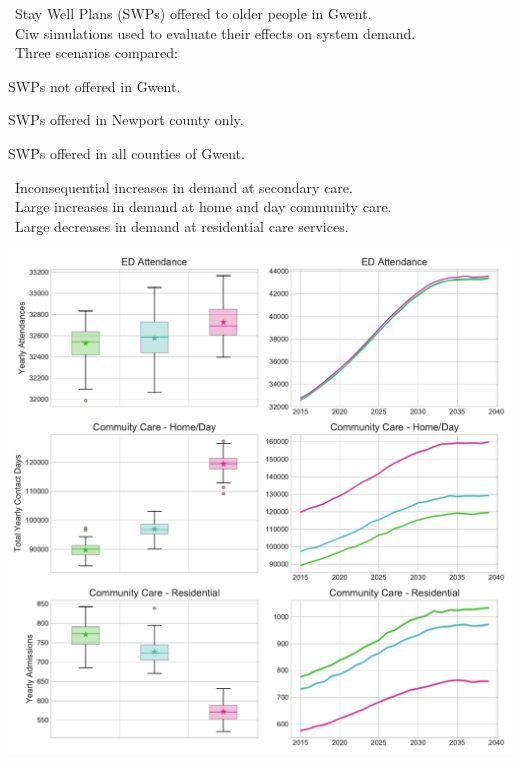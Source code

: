 \documentclass[usenames,dvipsnames,t]{beamer}
\begin{document}
\begin{center}
\begin{minipage}{0.35\textwidth}
    
\end{minipage}
\hspace{3mm}
\begin{minipage}{0.25\textwidth}
  \textbullet\ Stay Well Plans (SWPs) offered to older people in Gwent.\\[2mm]
  \textbullet\ Ciw simulations used to evaluate their effects on system demand.\\[2mm]
  \textbullet\ Three scenarios compared:\\[0.5mm]
  \begin{tcolorbox}[boxrule=2pt, colback=nowhere!15,colframe=nowhere]
      SWPs not offered in Gwent.
  \end{tcolorbox}
  \begin{tcolorbox}[boxrule=2pt, colback=newport!15,colframe=newport]
      SWPs offered in Newport county only.
  \end{tcolorbox}
  \begin{tcolorbox}[boxrule=2pt, colback=everywhere!15,colframe=everywhere]
      SWPs offered in all counties of Gwent.
  \end{tcolorbox}
  \textbullet\ Inconsequential increases in demand at secondary care.\\[2mm]
  \textbullet\ Large increases in demand at home and day community care.\\[2mm]
  \textbullet\ Large decreases in demand at residential care services.
\end{minipage}
\hspace{3mm}
\begin{minipage}{0.35\textwidth}
    \includegraphics[width=\textwidth]{SWPplots}
\end{minipage}
\end{center}
\end{document}
